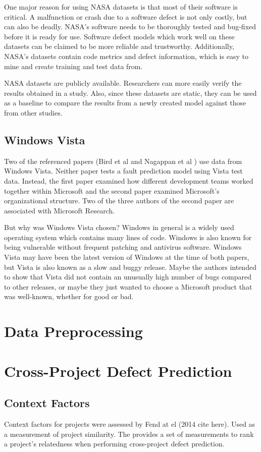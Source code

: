 \documentclass{sig-alternate-05-2015}
\begin{document}
One major reason for using NASA datasets is that most of their software is critical. A malfunction or crash due to a software defect is not only costly, but can also be deadly. NASA's software needs to be thoroughly tested and bug-fixed before it is ready for use. Software defect models which work well on these datasets can be claimed to be more reliable and trustworthy. Additionally, NASA's datasets contain code metrics and defect information, which is easy to mine and create training and test data from.

NASA datasets are publicly available. Researchers can more easily verify the results obtained in a study. Also, since these datasets are static, they can be used as a baseline to compare the results from a newly created model against those from other studies.
\subsection{Windows Vista}
Two of the referenced papers (Bird et al \cite{Bird} and Nagappan et al \cite{Nagappan}) use data from Windows Vista. Neither paper tests a fault prediction model using Vista test data. Instead, the first paper examined how different development teams worked together within Microsoft and the second paper examined Microsoft's organizational structure. Two of the three authors of the second paper are associated with Microsoft Research. 

But why was Windows Vista chosen? Windows in general is a widely used operating system which contains many lines of code. Windows is also known for being vulnerable without frequent patching and antivirus software. Windows Vista may have been the latest version of Windows at the time of both papers, but Vista is also known as a slow and buggy release. Maybe the authors intended to show that Vista did not contain an unusually high number of bugs compared to other releases, or maybe they just wanted to choose a Microsoft product that was well-known, whether for good or bad.

\section{Data Preprocessing}

\section{Cross-Project Defect Prediction}

\subsection{Context Factors}
Context factors for projects were assessed by Fend at el (2014 cite here). Used as a measurement of project similarity. The provides a set of measurements to rank a project's relatedness when performing cross-project defect prediction.
\end{document}
